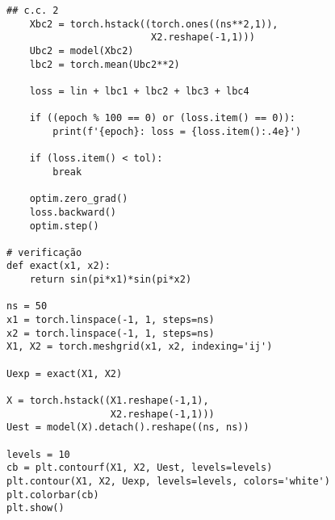 \begin{lstlisting}[caption=py\_pinn\_poisson]
    ## c.c. 2
    Xbc2 = torch.hstack((torch.ones((ns**2,1)),
                         X2.reshape(-1,1)))
    Ubc2 = model(Xbc2)
    lbc2 = torch.mean(Ubc2**2)

    loss = lin + lbc1 + lbc2 + lbc3 + lbc4

    if ((epoch % 100 == 0) or (loss.item() == 0)):
        print(f'{epoch}: loss = {loss.item():.4e}')

    if (loss.item() < tol):
        break

    optim.zero_grad()
    loss.backward()
    optim.step()

# verificação
def exact(x1, x2):
    return sin(pi*x1)*sin(pi*x2)

ns = 50
x1 = torch.linspace(-1, 1, steps=ns)
x2 = torch.linspace(-1, 1, steps=ns)
X1, X2 = torch.meshgrid(x1, x2, indexing='ij')

Uexp = exact(X1, X2)

X = torch.hstack((X1.reshape(-1,1),
                  X2.reshape(-1,1)))
Uest = model(X).detach().reshape((ns, ns))

levels = 10
cb = plt.contourf(X1, X2, Uest, levels=levels)
plt.contour(X1, X2, Uexp, levels=levels, colors='white')
plt.colorbar(cb)
plt.show()
\end{lstlisting}



